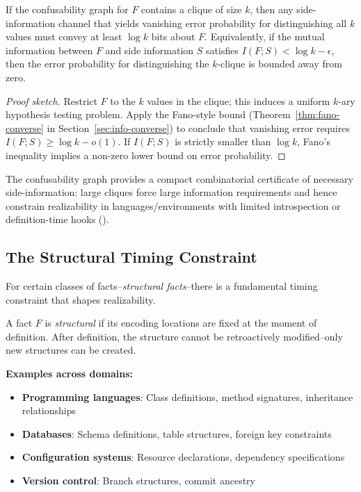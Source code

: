 \begin{lemma}\label{lem:confusability-clique}
If the confusability graph for $F$ contains a clique of size $k$, then any side-information channel that yields vanishing error probability for distinguishing all $k$ values must convey at least $\log k$ bits about $F$. Equivalently, if the mutual information between $F$ and side information $S$ satisfies $I(F;S)<\log k - \epsilon$, then the error probability for distinguishing the $k$-clique is bounded away from zero.
\end{lemma}

\begin{proof}[Proof sketch]
Restrict $F$ to the $k$ values in the clique; this induces a uniform $k$-ary hypothesis testing problem. Apply the Fano-style bound (Theorem~\ref{thm:fano-converse} in Section~\ref{sec:info-converse}) to conclude that vanishing error requires $I(F;S)\ge\log k - o(1)$. If $I(F;S)$ is strictly smaller than $\log k$, Fano's inequality implies a non-zero lower bound on error probability.
\end{proof}

\noindent The confusability graph provides a compact combinatorial certificate of necessary side-information: large cliques force large information requirements and hence constrain realizability in languages/environments with limited introspection or definition-time hooks ().

\subsection{The Structural Timing Constraint}\label{sec:timing}

For certain classes of facts--\emph{structural facts}--there is a fundamental timing constraint that shapes realizability.

\begin{definition}\label{def:structural-fact-req}
A fact $F$ is \emph{structural} if its encoding locations are fixed at the moment of definition. After definition, the structure cannot be retroactively modified--only new structures can be created.
\end{definition}

\textbf{Examples across domains:}
\begin{itemize}
\tightlist
\item \textbf{Programming languages}: Class definitions, method signatures, inheritance relationships
\item \textbf{Databases}: Schema definitions, table structures, foreign key constraints
\item \textbf{Configuration systems}: Resource declarations, dependency specifications
\item \textbf{Version control}: Branch structures, commit ancestry
\end{itemize}

